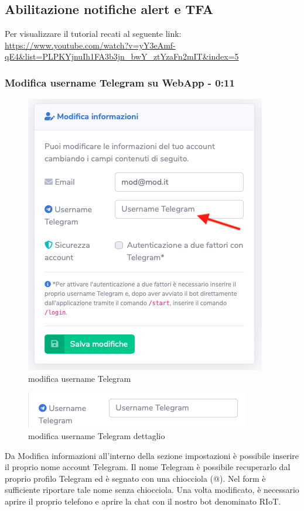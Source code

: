\subsection{Abilitazione notifiche alert e TFA}
Per visualizzare il tutorial recati al seguente link: 
\url{https://www.youtube.com/watch?v=yY3eAmf-qE4&list=PLPKYjnuIh1FA3b3jn_bwY_ztYzaFn2mIT&index=5}

	\subsubsection{Modifica username Telegram su WebApp - 0:11}

		\begin{figure}[H]
		\centering
		\includegraphics[scale=0.600]{res/images/membro/modUsername1.png}
		\caption{modifica username Telegram}
	\end{figure}
	\begin{figure}[H]
		\centering
		\includegraphics[scale=0.600]{res/images/membro/modUsTelegram.png}
		\caption{modifica username Telegram dettaglio}
	\end{figure}


		Da Modifica informazioni all'interno della sezione impostazioni è possibile inserire il proprio nome account Telegram. Il nome Telegram è possibile recuperarlo dal proprio profilo Telegram ed è segnato con una chiocciola (@). Nel form è sufficiente riportare tale nome senza chiocciola.
		Una volta modificato, è necessario aprire il proprio telefono e aprire la chat con il nostro bot denominato RIoT.

